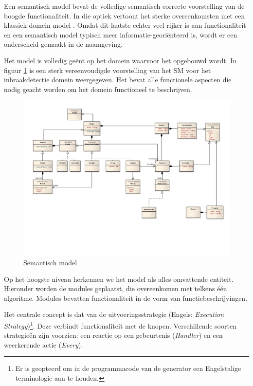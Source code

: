 Een semantisch model bevat de volledige semantisch correcte voorstelling van de
boogde functionaliteit. In die optiek vertoont het sterke overeenkomsten met
een klassiek domein model \citep{fowler2010domain}. Omdat dit laatste echter
veel rijker is aan functionaliteit en een semantisch model typisch meer
informatie-geori\"enteerd is, wordt er een onderscheid gemaakt in de naamgeving.

Het model is volledig ge\"ent op het domein waarvoor het opgebouwd wordt. In
figuur \ref{fig:arch-semantic-model} is een sterk vereenvoudigde voorstelling
van het SM voor het inbraakdetectie domein weergegeven. Het bevat alle
functionele aspecten die nodig geacht worden om het domein functioneel te
beschrijven.

\begin{figure}[ht]
  \centering
  \includegraphics[angle=90,width=0.865\linewidth]{resources/semantic.pdf}
  \caption{Semantisch model}
  \label{fig:arch-semantic-model}
\end{figure}

Op het hoogste niveau herkennen we het model als alles omvattende entiteit.
Hieronder worden de modules geplaatst, die overeenkomen met telkens \'e\'en
algoritme. Modules bevatten functionaliteit in de vorm van
functiebeschrijvingen.

Het centrale concept is dat van de uitvoeringsstrategie (Engels:
\emph{Execution Strategy})\footnote{Er is geopteerd om in de programmacode van
de generator een Engelstalige terminologie aan te houden.}. Deze verbindt
functionaliteit met de knopen. Verschillende soorten strategie\"en zijn
voorzien: een reactie op een gebeurtenis (\emph{Handler}) en een weerkerende
actie (\emph{Every}).

